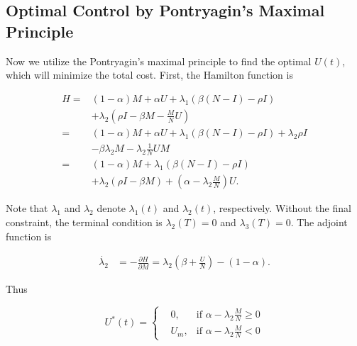 \subsection{Optimal Control by Pontryagin's Maximal Principle}
Now we utilize the Pontryagin's maximal principle to find the optimal $U(t)$, which will minimize the total cost.
First, the Hamilton function is
\begin{small}
\begin{equation}
\nonumber
\begin{aligned}
H =& (1-\alpha) M + \alpha U + \lambda_{1} (\beta (N-I) - \rho I) \\
& + \lambda_{2} (\rho I  - \beta M - \frac{M}{N} U) \\
=& (1-\alpha) M + \alpha U + \lambda_{1} (\beta (N-I) - \rho I) + \lambda_{2} \rho I\\
& - \beta \lambda_{2} M - \lambda_{2} \frac{1}{N} U M \\
=& (1-\alpha) M + \lambda_{1} (\beta (N-I) - \rho I) \\
& + \lambda_{2} (\rho I  - \beta M) + ( \alpha - \lambda_{2} \frac{M}{N}) U.
\end{aligned}
\end{equation}
\end{small}
Note that $\lambda_{1}$ and $\lambda_{2}$ denote $\lambda_{1}(t)$ and $\lambda_{2}(t)$, respectively.
Without the final constraint, the terminal condition is $\lambda_{2}(T) = 0$ and $\lambda_{3}(T) = 0$.
The adjoint function is
\begin{small}
\begin{equation}
\nonumber
\begin{aligned}
\dot{\lambda_{2}} &= - \frac{ \partial H}{ \partial M} = \lambda_{2} (\beta + \frac{U}{N} ) - (1-\alpha).
\end{aligned}
\end{equation}
\end{small}

Thus
\begin{small}
\begin{equation}
\label{eq:opt_U}
U^{*}(t) =
\left\{
\begin{aligned}
&0,      & \text{if }  \alpha - \lambda_{2} \frac{M}{N} \ge 0 \\
&U_{m},        & \text{if } \alpha - \lambda_{2} \frac{M}{N} < 0
\end{aligned}
\right.
\end{equation}
\end{small}

